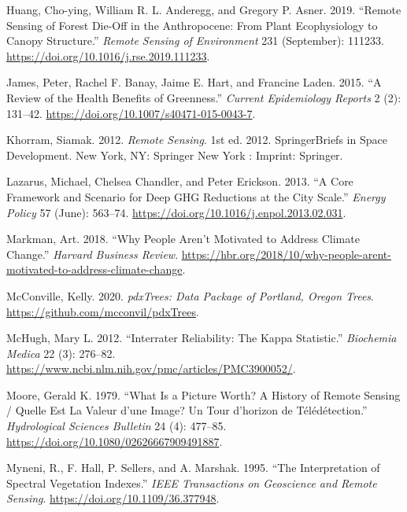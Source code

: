 \documentclass[12pt,twoside]{reedthesis}
\newlength{\cslhangindent}
\newenvironment{CSLReferences}[2] %
 {%
  \setlength{\parindent}{0pt}
  \ifodd #1 \everypar{\setlength{\hangindent}{\cslhangindent}}\ignorespaces\fi
  \ifnum #2 > 0
  \setlength{\parskip}{#2\baselineskip}
  \fi
 }%
 {}
\begin{document}
\begin{CSLReferences}{1}{0}
\leavevmode{}%
Huang, Cho-ying, William R. L. Anderegg, and Gregory P. Asner. 2019. {``Remote Sensing of Forest Die-Off in the Anthropocene: From Plant Ecophysiology to Canopy Structure.''} \emph{Remote Sensing of Environment} 231 (September): 111233. \url{https://doi.org/10.1016/j.rse.2019.111233}.

\leavevmode{}%
James, Peter, Rachel F. Banay, Jaime E. Hart, and Francine Laden. 2015. {``A Review of the Health Benefits of Greenness.''} \emph{Current Epidemiology Reports} 2 (2): 131--42. \url{https://doi.org/10.1007/s40471-015-0043-7}.

\leavevmode{}%
Khorram, Siamak. 2012. \emph{Remote Sensing}. 1st ed. 2012. SpringerBriefs in Space Development. New York, NY: Springer New York : Imprint: Springer.

\leavevmode{}%
Lazarus, Michael, Chelsea Chandler, and Peter Erickson. 2013. {``A Core Framework and Scenario for Deep GHG Reductions at the City Scale.''} \emph{Energy Policy} 57 (June): 563--74. \url{https://doi.org/10.1016/j.enpol.2013.02.031}.

\leavevmode{}%
Markman, Art. 2018. {``Why People Aren{'}t Motivated to Address Climate Change.''} \emph{Harvard Business Review}. \url{https://hbr.org/2018/10/why-people-arent-motivated-to-address-climate-change}.

\leavevmode{}%
McConville, Kelly. 2020. \emph{pdxTrees: Data Package of Portland, Oregon Trees}. \url{https://github.com/mcconvil/pdxTrees}.

\leavevmode{}%
McHugh, Mary L. 2012. {``Interrater Reliability: The Kappa Statistic.''} \emph{Biochemia Medica} 22 (3): 276--82. \url{https://www.ncbi.nlm.nih.gov/pmc/articles/PMC3900052/}.

\leavevmode{}%
Moore, Gerald K. 1979. {``What Is a Picture Worth? A History of Remote Sensing / Quelle Est La Valeur d'une Image? Un Tour d'horizon de Télédétection.''} \emph{Hydrological Sciences Bulletin} 24 (4): 477--85. \url{https://doi.org/10.1080/02626667909491887}.

\leavevmode{}%
Myneni, R., F. Hall, P. Sellers, and A. Marshak. 1995. {``The Interpretation of Spectral Vegetation Indexes.''} \emph{IEEE Transactions on Geoscience and Remote Sensing}. \url{https://doi.org/10.1109/36.377948}.


\end{CSLReferences}
\end{document}
